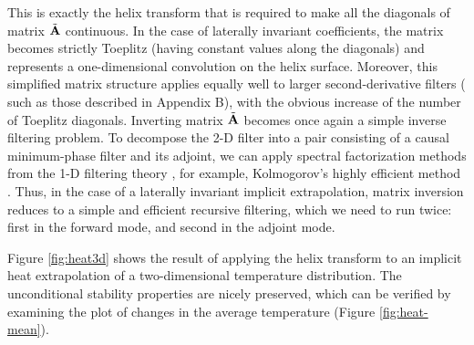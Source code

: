 \par
This is exactly the helix transform that is required to make all the
diagonals of matrix $\tilde{\bold{A}}$ continuous. In the case of
laterally invariant coefficients, the matrix becomes strictly Toeplitz
(having constant values along the diagonals) and represents a
one-dimensional convolution on the helix surface. Moreover, this
simplified matrix structure applies equally well to larger
second-derivative filters ( such as those described in Appendix B),
with the obvious increase of the number of Toeplitz diagonals.
Inverting matrix $\tilde{\bold{A}}$ becomes once again a simple
inverse filtering problem.  To decompose the 2-D filter into a pair
consisting of a causal minimum-phase filter and its adjoint, we can
apply spectral factorization methods from the 1-D filtering theory
\cite{Claerbout.blackwell.76,Claerbout.blackwell.92}, for example,
Kolmogorov's highly efficient method \cite{kolmog}. Thus, in the case
of a laterally invariant implicit extrapolation, matrix inversion
reduces to a simple and efficient recursive filtering, which we need
to run twice: first in the forward mode, and second in the adjoint
mode.


\par
Figure \ref{fig:heat3d} shows the result of applying the helix
transform to an implicit heat extrapolation of a two-dimensional
temperature distribution. The unconditional stability properties are
nicely preserved, which can be verified by examining the plot of
changes in the average temperature (Figure \ref{fig:heat-mean}).

